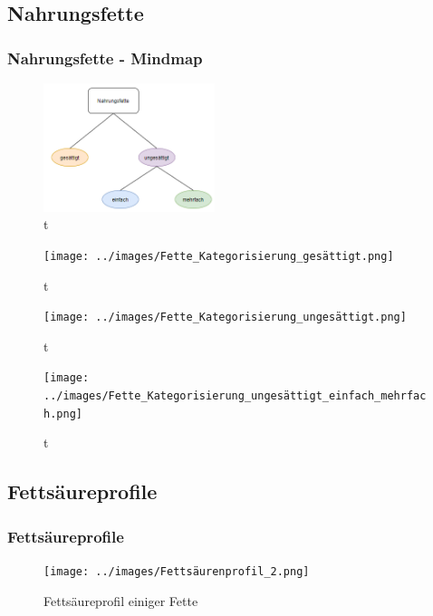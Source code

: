 \documentclass[xcolor=dvipsnames]{beamer}
\begin{document}
    \subsection{Nahrungsfette}
    \begin{frame}[allowframebreaks]
        \frametitle{Nahrungsfette - Mindmap}
        \begin{figure}{}
            \centering
            \includegraphics[width=5cm]{../images/Fette_Kategorisierung.png}
            \caption{t}
        \end{figure}

        \framebreak

        \begin{figure}{}
            \centering
            \texttt{[image: ../images/Fette\_Kategorisierung\_gesättigt.png]}
            \caption{t}
        \end{figure}

        \framebreak

        \begin{figure}{}
            \centering
            \texttt{[image: ../images/Fette\_Kategorisierung\_ungesättigt.png]}
            \caption{t}
        \end{figure}

        \framebreak

        \begin{figure}{}
            \centering
            \texttt{[image: ../images/Fette\_Kategorisierung\_ungesättigt\_einfach\_mehrfach.png]}
            \caption{t}
        \end{figure}
    \end{frame}

    \subsection{Fettsäureprofile}
    \begin{frame}
        \frametitle{Fettsäureprofile}

        \begin{figure}{}
            \centering
            \texttt{[image: ../images/Fettsäurenprofil\_2.png]}
            \caption{Fettsäureprofil einiger Fette}
        \end{figure}
    \end{frame}
\end{document}

